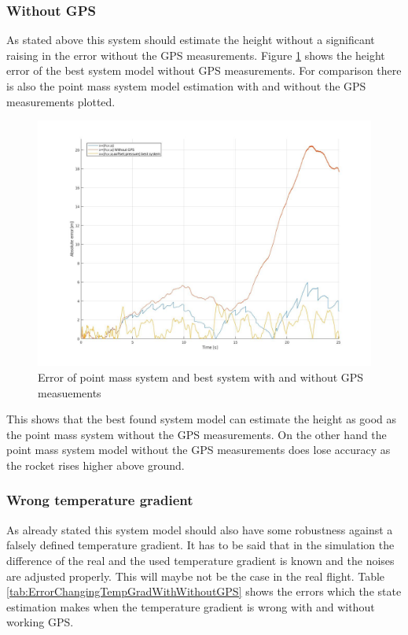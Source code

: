 \subsubsection{Without GPS}
As stated above this system should estimate the height without a significant raising in the error without the GPS measurements.
Figure \ref{fig:ErrorWitoutGPS} shows the height error of the best system model without GPS measurements.
For comparison there is also the point mass system model estimation with and without the GPS measurements plotted.

\begin{figure}[h!]
 \centering
 \includegraphics[width=.8\textwidth]{./Pictures/ErrorPointMassBestSystemWithoutGPS.jpg}
 \caption{Error of point mass system and best system with and without GPS measuements}
 \label{fig:ErrorWitoutGPS}
\end{figure}

This shows that the best found system model can estimate the height as good as the point mass system without the GPS measurements.
On the other hand the point mass system model without the GPS measurements does lose accuracy as the rocket rises higher above ground.

\subsubsection{Wrong temperature gradient}
As already stated this system model should also have some robustness against a falsely defined temperature gradient. 
It has to be said that in the simulation the difference of the real and the used temperature gradient is known and the noises are adjusted properly.
This will maybe not be the case in the real flight.
Table \ref{tab:ErrorChangingTempGradWithWithoutGPS} shows the errors which the state estimation makes when the temperature gradient is wrong with and without working GPS.


